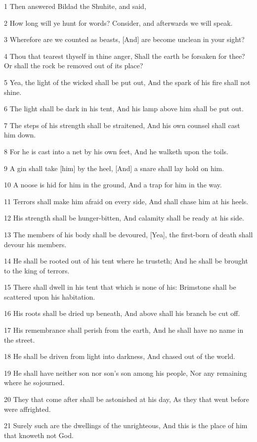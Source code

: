 \par 1 Then answered Bildad the Shuhite, and said,
\par 2 How long will ye hunt for words? Consider, and afterwards we will speak.
\par 3 Wherefore are we counted as beasts, [And] are become unclean in your sight?
\par 4 Thou that tearest thyself in thine anger, Shall the earth be forsaken for thee? Or shall the rock be removed out of its place?
\par 5 Yea, the light of the wicked shall be put out, And the spark of his fire shall not shine.
\par 6 The light shall be dark in his tent, And his lamp above him shall be put out.
\par 7 The steps of his strength shall be straitened, And his own counsel shall cast him down.
\par 8 For he is cast into a net by his own feet, And he walketh upon the toils.
\par 9 A gin shall take [him] by the heel, [And] a snare shall lay hold on him.
\par 10 A noose is hid for him in the ground, And a trap for him in the way.
\par 11 Terrors shall make him afraid on every side, And shall chase him at his heels.
\par 12 His strength shall be hunger-bitten, And calamity shall be ready at his side.
\par 13 The members of his body shall be devoured, [Yea], the first-born of death shall devour his members.
\par 14 He shall be rooted out of his tent where he trusteth; And he shall be brought to the king of terrors.
\par 15 There shall dwell in his tent that which is none of his: Brimstone shall be scattered upon his habitation.
\par 16 His roots shall be dried up beneath, And above shall his branch be cut off.
\par 17 His remembrance shall perish from the earth, And he shall have no name in the street.
\par 18 He shall be driven from light into darkness, And chased out of the world.
\par 19 He shall have neither son nor son's son among his people, Nor any remaining where he sojourned.
\par 20 They that come after shall be astonished at his day, As they that went before were affrighted.
\par 21 Surely such are the dwellings of the unrighteous, And this is the place of him that knoweth not God.

